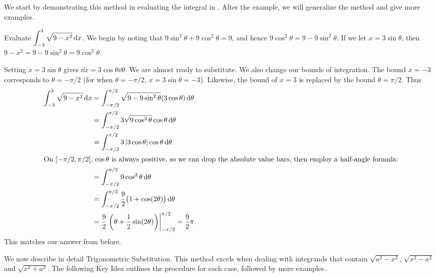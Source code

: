 
We start by demonstrating this method in evaluating the integral in . After the example, we will generalize the method and give more examples.

\begin{example}\label{ex_trigsub1}%
Evaluate $\displaystyle \int_{-3}^3\sqrt{9-x^2}\operatorname{d}\! x$.
\solution
We begin by noting that $9\sin^2\theta + 9\cos^2\theta = 9$, and hence $9\cos^2\theta = 9-9\sin^2\theta$. If we let $x=3\sin\theta$, then $9-x^2 = 9-9\sin^2\theta = 9\cos^2\theta$. 

Setting $x=3\sin \theta$ gives  $\dd x = 3\cos\theta\dd\theta$. We are almost ready to substitute. We also change our bounds of integration. The bound $x=-3$ corresponds to $\theta = -\pi/2$ (for when $\theta = -\pi/2$, $x=3\sin \theta = -3$). Likewise, the bound of $x=3$ is replaced by the bound $\theta = \pi/2$. Thus
\begin{align*}
	\int_{-3}^3\sqrt{9-x^2}\operatorname{d}\! x
	&= \int_{-\pi/2}^{\pi/2} \sqrt{9-9\sin^2\theta} (3\cos\theta)\operatorname{d}\!\theta \\
	&= \int_{-\pi/2}^{\pi/2} 3\sqrt{9\cos^2\theta} \cos\theta\operatorname{d}\!\theta \\
	&=\int_{-\pi/2}^{\pi/2} 3\left\lvert 3\cos \theta \right\rvert \cos\theta\operatorname{d}\!\theta.\\
	\intertext{On \([-\pi/2,\pi/2]\), \(\cos \theta\) is always positive, so we can drop the absolute value bars, then employ a half-angle formula:}
	&= \int_{-\pi/2}^{\pi/2} 9\cos^2 \theta\operatorname{d}\!\theta\\
	&= \int_{-\pi/2}^{\pi/2} \frac{9}{2}\bigl(1+\cos(2\theta)\bigr)\operatorname{d}\!\theta\\
	& = \frac92 \left.\left(\theta +\frac12\sin(2\theta)\right)\right|_{-\pi/2}^{\pi/2}= \frac92\pi.
\end{align*}
This matches our answer from before.
\end{example}

We now describe in detail Trigonometric Substitution. This method excels when dealing with integrands that contain $\sqrt{a^2-x^2}$, $\sqrt{x^2-a^2}$ and $\sqrt{x^2+a^2}$. The following Key Idea outlines the procedure for each case, followed by more examples.

